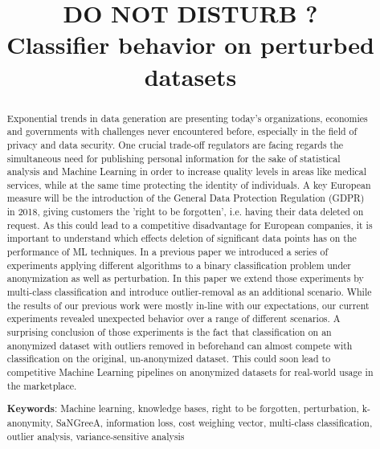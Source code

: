 \documentclass{llncs}
\begin{document}
\title{DO NOT DISTURB ? \\ Classifier behavior on perturbed datasets}


	
\maketitle

\begin{abstract}

Exponential trends in data generation are presenting today's organizations, economies and governments with challenges never encountered before, especially in the field of privacy and data security. One crucial trade-off regulators are facing regards the simultaneous need for publishing personal information for the sake of statistical analysis and Machine Learning in order to increase quality levels in areas like medical services, while at the same time protecting the identity of individuals. A key European measure will be the introduction of the General Data Protection Regulation (GDPR) in 2018, giving customers the 'right to be forgotten', i.e. having their data deleted on request. As this could lead to a competitive disadvantage for European companies, it is important to understand which effects deletion of significant data points has on the performance of ML techniques. In a previous paper we introduced a series of experiments applying different algorithms to a binary classification problem under anonymization as well as perturbation. In this paper we extend those experiments by multi-class classification and introduce outlier-removal as an additional scenario. While the results of our previous work were mostly in-line with our expectations, our current experiments revealed unexpected behavior over a range of different scenarios. A surprising conclusion of those experiments is the fact that classification on an anonymized dataset with outliers removed in beforehand can almost compete with classification on the original, un-anonymized dataset. This could soon lead to competitive Machine Learning pipelines on anonymized datasets for real-world usage in the marketplace.


\medskip

\textbf{Keywords}: Machine learning, knowledge bases, right to be forgotten, perturbation, k-anonymity, SaNGreeA, information loss, cost weighing vector, multi-class classification, outlier analysis, variance-sensitive analysis


\end{abstract}
\end{document}
